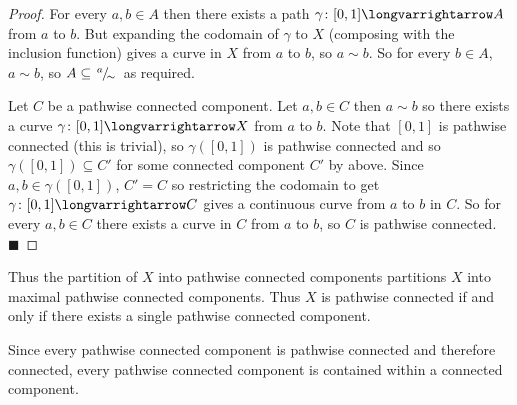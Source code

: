 \documentclass[10pt]{article}
\def\qed{\hskip1cm\penalty-100\hbox{}\hfill$\blacksquare$}
\def\longto{\longvarrightarrow}
\begin{document}
\begin{proof}

    \benum
        \item For every $a,b\in A$ then there exists a path $\gamma\colon[0,1]\longto A$ from $a$ to $b$.
        But expanding the codomain of $\gamma$ to $X$ (composing with the inclusion function) gives a curve in $X$ from $a$ to $b$, so $a\sim b$.
        So for every $b\in A$, $a\sim b$, so $A\subseteq\slfrac a\sim$ as required.
        \item Let $C$ be a pathwise connected component.
        Let $a,b\in C$ then $a\sim b$ so there exists a curve $\gamma\colon[0,1]\longto X$ from $a$ to $b$.
        Note that $[0,1]$ is pathwise connected (this is trivial), so $\gamma([0,1])$ is pathwise connected and so $\gamma([0,1])\subseteq C'$ for some connected component $C'$ by above.
        Since $a,b\in\gamma([0,1])$, $C'=C$ so restricting the codomain to get $\gamma\colon[0,1]\longto C$ gives a continuous curve from $a$ to $b$ in $C$.
        So for every $a,b\in C$ there exists a curve in $C$ from $a$ to $b$, so $C$ is pathwise connected.
        \qed
    \eenum

\end{proof}

Thus the partition of $X$ into pathwise connected components partitions $X$ into maximal pathwise connected components.
Thus $X$ is pathwise connected if and only if there exists a single pathwise connected component.

Since every pathwise connected component is pathwise connected and therefore connected, every pathwise connected component is contained within a connected component.
\end{document}
